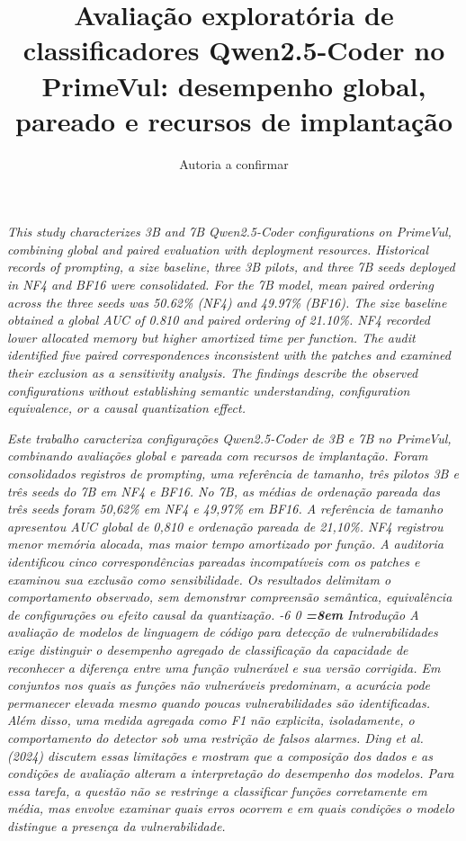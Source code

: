 \documentclass[12pt,a4paper]{article}
\title{Avaliação exploratória de classificadores Qwen2.5-Coder no PrimeVul: desempenho global, pareado e recursos de implantação}
\author{Autoria a confirmar}
\makeatletter
\newcommand{\XIIIPT}{\@setfontsize\xiiipt{13}{17}}
\renewcommand\section{\@startsection{section}{1}{\z@}%
                       {-6\p@ \@plus -4\p@ \@minus -4\p@}%
                       {0\p@ \@plus 4\p@ \@minus 4\p@}%
                       {\normalfont\XIIIPT\bfseries\boldmath
                        \rightskip=\z@ \@plus 8em\pretolerance=10000 }}
\let\maketitleOLD\maketitle
\renewcommand{\maketitle}{\maketitleOLD\thispagestyle{empty}}
\renewenvironment{abstract}{%
      \list{}{\advance\topsep by6pt\relax%
      \leftmargin=0.8cm
      \labelwidth=\z@
      \listparindent=\z@
      \itemindent\listparindent
      \rightmargin\leftmargin}\item[\hskip\labelsep
                                    \bfseries\itshape Abstract.]\itshape}%
      {\endlist}
\newenvironment{resumo}{%
      \list{}{\advance\topsep by6pt\relax%
      \leftmargin=0.8cm
      \labelwidth=\z@
      \listparindent=\z@
      \itemindent\listparindent
      \rightmargin\leftmargin}\item[\hskip\labelsep
                                    \bfseries\itshape Resumo.]\itshape}%
      {\endlist}
\makeatother
\begin{document}
\maketitle
\begin{abstract}
This study characterizes 3B and 7B Qwen2.5-Coder configurations on PrimeVul, combining global and paired evaluation with deployment resources. Historical records of prompting, a size baseline, three 3B pilots, and three 7B seeds deployed in NF4 and BF16 were consolidated. For the 7B model, mean paired ordering across the three seeds was 50.62\% (NF4) and 49.97\% (BF16). The size baseline obtained a global AUC of 0.810 and paired ordering of 21.10\%. NF4 recorded lower allocated memory but higher amortized time per function. The audit identified five paired correspondences inconsistent with the patches and examined their exclusion as a sensitivity analysis. The findings describe the observed configurations without establishing semantic understanding, configuration equivalence, or a causal quantization effect.
\end{abstract}
\begin{resumo}
Este trabalho caracteriza configurações Qwen2.5-Coder de 3B e 7B no PrimeVul, combinando avaliações global e pareada com recursos de implantação. Foram consolidados registros de prompting, uma referência de tamanho, três pilotos 3B e três seeds do 7B em NF4 e BF16. No 7B, as médias de ordenação pareada das três seeds foram 50,62\% em NF4 e 49,97\% em BF16. A referência de tamanho apresentou AUC global de 0,810 e ordenação pareada de 21,10\%. NF4 registrou menor memória alocada, mas maior tempo amortizado por função. A auditoria identificou cinco correspondências pareadas incompatíveis com os patches e examinou sua exclusão como sensibilidade. Os resultados delimitam o comportamento observado, sem demonstrar compreensão semântica, equivalência de configurações ou efeito causal da quantização.
\end{resumo}
\section{Introdução}
A avaliação de modelos de linguagem de código para detecção de vulnerabilidades exige distinguir o desempenho agregado de classificação da capacidade de reconhecer a diferença entre uma função vulnerável e sua versão corrigida. Em conjuntos nos quais as funções não vulneráveis predominam, a acurácia pode permanecer elevada mesmo quando poucas vulnerabilidades são identificadas. Além disso, uma medida agregada como F1 não explicita, isoladamente, o comportamento do detector sob uma restrição de falsos alarmes. Ding et al. (2024) discutem essas limitações e mostram que a composição dos dados e as condições de avaliação alteram a interpretação do desempenho dos modelos. Para essa tarefa, a questão não se restringe a classificar funções corretamente em média, mas envolve examinar quais erros ocorrem e em quais condições o modelo distingue a presença da vulnerabilidade.
\end{document}
